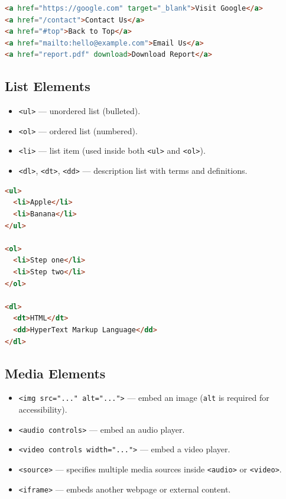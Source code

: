 \documentclass[hidelinks]{article}
\begin{document}
\begin{lstlisting}[language=HTML, caption={Hyperlink examples}]
<a href="https://google.com" target="_blank">Visit Google</a>
<a href="/contact">Contact Us</a>
<a href="#top">Back to Top</a>
<a href="mailto:hello@example.com">Email Us</a>
<a href="report.pdf" download>Download Report</a>
\end{lstlisting}

\subsection{List Elements}
\begin{itemize}
  \item \texttt{<ul>} --- unordered list (bulleted).
  \item \texttt{<ol>} --- ordered list (numbered).
  \item \texttt{<li>} --- list item (used inside both \texttt{<ul>} and \texttt{<ol>}).
  \item \texttt{<dl>}, \texttt{<dt>}, \texttt{<dd>} --- description list with terms and definitions.
\end{itemize}

\begin{lstlisting}[language=HTML, caption={List examples}]
<ul>
  <li>Apple</li>
  <li>Banana</li>
</ul>

<ol>
  <li>Step one</li>
  <li>Step two</li>
</ol>

<dl>
  <dt>HTML</dt>
  <dd>HyperText Markup Language</dd>
</dl>
\end{lstlisting}

\subsection{Media Elements}
\begin{itemize}
  \item \texttt{<img src="..." alt="...">} --- embed an image (\texttt{alt} is required for accessibility).
  \item \texttt{<audio controls>} --- embed an audio player.
  \item \texttt{<video controls width="...">} --- embed a video player.
  \item \texttt{<source>} --- specifies multiple media sources inside \texttt{<audio>} or \texttt{<video>}.
  \item \texttt{<iframe>} --- embeds another webpage or external content.
\end{itemize}
\end{document}
